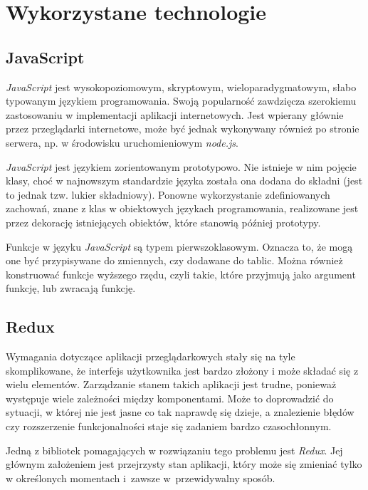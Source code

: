 \documentclass[12pt,a4paper,polish,thesis]{dcsbook}
\begin{document}
{	\section{Wykorzystane technologie}

	\subsection{JavaScript}

	\textit{JavaScript} jest wysokopoziomowym, skryptowym, wieloparadygmatowym, słabo typowanym językiem programowania. Swoją popularność zawdzięcza szerokiemu zastosowaniu w implementacji aplikacji internetowych. Jest wpierany głównie przez przeglądarki internetowe, może być jednak wykonywany również po stronie serwera, np. w środowisku uruchomieniowym \textit{node.js}.

	\textit{JavaScript} jest językiem zorientowanym prototypowo. Nie istnieje w nim pojęcie klasy, choć w najnowszym standardzie języka została ona dodana do składni (jest to jednak tzw. lukier składniowy). Ponowne wykorzystanie zdefiniowanych zachowań, znane z klas w obiektowych językach programowania, realizowane jest przez dekorację istniejących obiektów, które stanowią później prototypy.

	Funkcje w języku \textit{JavaScript} są typem pierwszoklasowym. Oznacza to, że mogą one być przypisywane do zmiennych, czy dodawane do tablic. Można również konstruować funkcje wyższego rzędu, czyli takie, które przyjmują jako argument funkcję, lub zwracają funkcję.

	\subsection{Redux} \label{Redux}

	Wymagania dotyczące aplikacji przeglądarkowych stały się na tyle skomplikowane, że interfejs użytkownika jest bardzo złożony i może składać się z wielu elementów. Zarządzanie stanem takich aplikacji jest trudne, ponieważ występuje wiele zależności między komponentami. Może to doprowadzić do sytuacji, w której nie jest jasne co tak naprawdę się dzieje, a znalezienie błędów czy rozszerzenie funkcjonalności staje się zadaniem bardzo czasochłonnym.

	Jedną z bibliotek pomagających w rozwiązaniu tego problemu jest \textit{Redux}. Jej głównym założeniem jest przejrzysty stan aplikacji, który może się zmieniać tylko w określonych momentach i~zawsze w~przewidywalny sposób.

}
\end{document}
